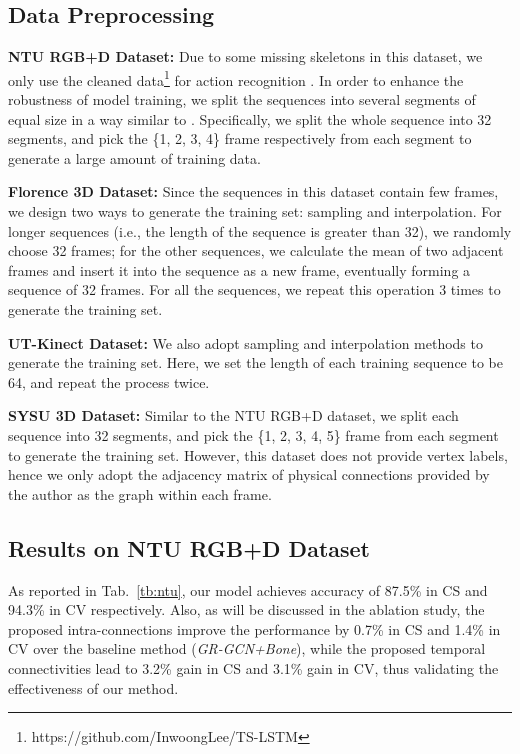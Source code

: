 \documentclass[conference]{IEEEtran}
\begin{document}
\subsection{Data Preprocessing}
\label{subsec:preprocess}

\textbf{NTU RGB+D Dataset:} Due to some missing skeletons in this dataset, we only use the cleaned data\footnote{https://github.com/InwoongLee/TS-LSTM} for action recognition \cite{lee17}. In order to enhance the robustness of model training, we split the sequences into several segments of equal size in a way similar to \cite{li18spatio}. Specifically, we split the whole sequence into 32 segments, and pick the \{1, 2, 3, 4\} frame respectively from each segment to generate a large amount of training data.
    


\textbf{Florence 3D Dataset:} Since the sequences in this dataset contain few frames, we design two ways to generate the training set: sampling and interpolation. For longer sequences (i.e., the length of the sequence is greater than 32), we randomly choose 32 frames; for the other sequences, we calculate the mean of two adjacent frames and insert it into the sequence as a new frame, eventually forming a sequence of 32 frames. For all the sequences, we repeat this operation 3 times to generate the training set.
    


\textbf{UT-Kinect Dataset:} We also adopt sampling and interpolation methods to generate the training set. Here, we set the length of each training sequence to be 64, and repeat the process twice. 

\textbf{SYSU 3D Dataset:} Similar to the NTU RGB+D dataset, we split each sequence into 32 segments, and pick the \{1, 2, 3, 4, 5\} frame from each segment to generate the training set. However, this dataset does not provide vertex labels, hence we only adopt the adjacency matrix of physical connections provided by the author as the graph within each frame.
    


\subsection{Results on NTU RGB+D Dataset}
\label{subsec:ntu}
As reported in Tab.~\ref{tb:ntu}, our model achieves accuracy of 87.5\% in CS and 94.3\% in CV respectively. Also, as will be discussed in the ablation study, the proposed intra-connections improve the performance by 0.7\% in CS and 1.4\% in CV over the baseline method (\textit{GR-GCN+Bone}), while the proposed temporal connectivities lead to 3.2\% gain in CS and 3.1\% gain in CV, thus validating the effectiveness of our method.   
\end{document}
